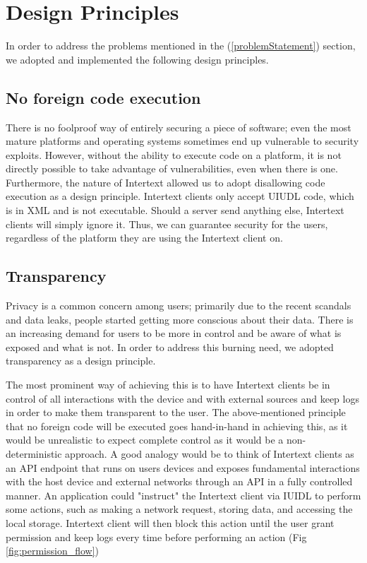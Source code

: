 
\section{Design Principles} \label{designPrinciples}

In order to address the problems mentioned in the  (\ref{problemStatement}) section, we adopted and implemented the following design principles.

\subsection{No foreign code execution}

There is no foolproof way of entirely securing a piece of software; even the most mature platforms and operating systems sometimes end up vulnerable to security exploits. However, without the ability to execute code on a platform, it is not directly possible to take advantage of vulnerabilities, even when there is one. Furthermore, the nature of Intertext allowed us to adopt disallowing code execution as a design principle. Intertext clients only accept UIUDL code, which is in XML and is not executable. Should a server send anything else, Intertext clients will simply ignore it. Thus, we can guarantee security for the users, regardless of the platform they are using the Intertext client on.

\subsection{Transparency}

Privacy is a common concern among users; primarily due to the recent scandals and data leaks, people started getting more conscious about their data. There is an increasing demand for users to be more in control and be aware of what is exposed and what is not. In order to address this burning need, we adopted transparency as a design principle. 

The most prominent way of achieving this is to have Intertext clients be in control of all interactions with the device and with external sources and keep logs in order to make them transparent to the user. The above-mentioned principle that no foreign code will be executed goes hand-in-hand in achieving this, as it would be unrealistic to expect complete control as it would be a non-deterministic approach. A good analogy would be to think of Intertext clients as an API endpoint that runs on users devices and exposes fundamental interactions with the host device and external networks through an API in a fully controlled manner. An application could "instruct" the Intertext client via IUIDL to perform some actions, such as making a network request, storing data, and accessing the local storage. Intertext client will then block this action until the user grant permission and keep logs every time before performing an action (Fig \ref{fig:permission_flow})

